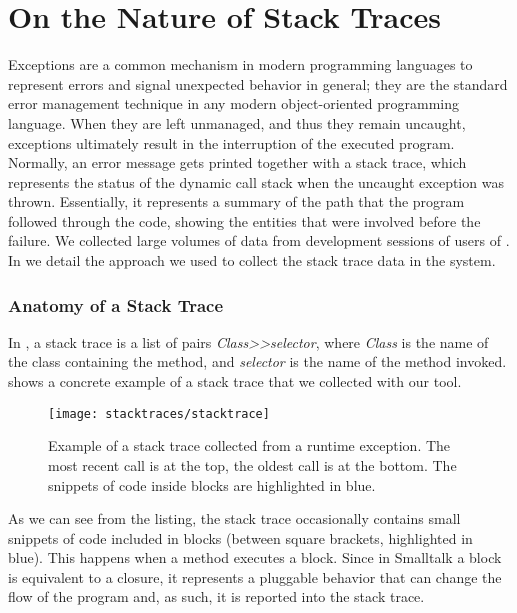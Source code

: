 \section{On the Nature of Stack Traces} \label{sec:stacktraces-nature}

Exceptions are a common mechanism in modern programming languages to represent errors and signal unexpected behavior in general; they are the standard error management technique in any modern object-oriented programming language.
When they are left unmanaged, and thus they remain uncaught, exceptions ultimately result in the interruption of the executed program.
Normally, an error message gets printed together with a stack trace, which represents the status of the dynamic call stack when the uncaught exception was thrown.
Essentially, it represents a summary of the path that the program followed through the code, showing the entities that were involved before the failure.
We collected large volumes of data from development sessions of users of \pha.
In  we detail the approach we used to collect the stack trace data in the \pha system.


\subsubsection{Anatomy of a Stack Trace}

In \pha, a stack trace is a list of pairs \textit{Class{>}{>}selector}, where \textit{Class} is the name of the class containing the method, and \textit{selector} is the name of the method invoked.
 shows a concrete example of a stack trace that we collected with our tool.

\begin{figure}[ht]
\centering
  \texttt{[image: stacktraces/stacktrace]}
  \caption[Example of a stack trace collected from a runtime exception]{Example of a stack trace collected from a runtime exception.
The most recent call is at the top, the oldest call is at the bottom.
The snippets of code inside blocks are highlighted in blue.}
  \label{fig:stacktrace}
\end{figure}

As we can see from the listing, the stack trace occasionally contains small snippets of code included in blocks (between square brackets, highlighted in blue).
This happens when a method executes a block.
Since in Smalltalk a block is equivalent to a closure, it represents a pluggable behavior that can change the flow of the program and, as such, it is reported into the stack trace.

